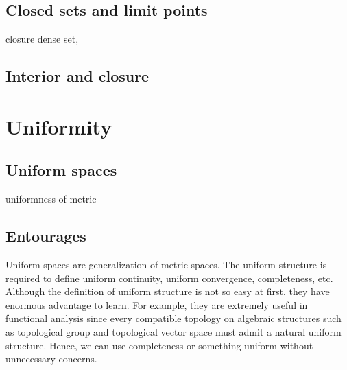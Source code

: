 \subsection{Closed sets and limit points}
 closure
 dense set,
\subsection{Interior and closure}




























\section{Uniformity}

\subsection{Uniform spaces}
uniformness of metric


\subsection{Entourages}


Uniform spaces are generalization of metric spaces.
The uniform structure is required to define uniform continuity, uniform convergence, completeness, etc.
Although the definition of uniform structure is not so easy at first, they have enormous advantage to learn.
For example, they are extremely useful in functional analysis since every compatible topology on algebraic structures such as topological group and topological vector space must admit a natural uniform structure.
Hence, we can use completeness or something uniform without unnecessary concerns.

